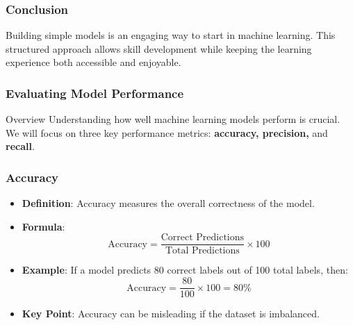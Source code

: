 \documentclass[aspectratio=169]{beamer}
\begin{document}
\begin{frame}
    \frametitle{Conclusion}
    Building simple models is an engaging way to start in machine learning. This structured approach allows skill development while keeping the learning experience both accessible and enjoyable.
\end{frame}

\begin{frame}[fragile]
    \frametitle{Evaluating Model Performance}
    \begin{block}{Overview}
        Understanding how well machine learning models perform is crucial. We will focus on three key performance metrics: 
        \textbf{accuracy, precision,} and \textbf{recall}.
    \end{block}
\end{frame}

\begin{frame}[fragile]
    \frametitle{Accuracy}
    \begin{itemize}
        \item \textbf{Definition}:
        Accuracy measures the overall correctness of the model.
        \item \textbf{Formula}:
        \begin{equation}
        \text{Accuracy} = \frac{\text{Correct Predictions}}{\text{Total Predictions}} \times 100
        \end{equation}
        \item \textbf{Example}:
        If a model predicts 80 correct labels out of 100 total labels, then:
        \[
        \text{Accuracy} = \frac{80}{100} \times 100 = 80\%
        \]
        \item \textbf{Key Point}:
        Accuracy can be misleading if the dataset is imbalanced.
    \end{itemize}
\end{frame}
\end{document}
